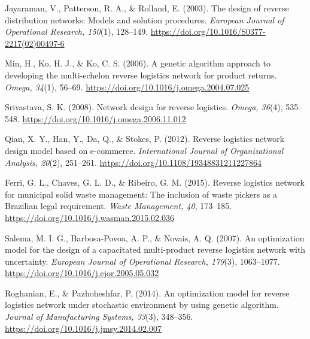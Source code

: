 \newpage %
\begin{thebibliography}{99} %

Jayaraman, V., Patterson, R. A., \& Rolland, E. (2003). The design of reverse distribution networks: Models and solution procedures. \textit{European Journal of Operational Research, 150}(1), 128--149. \href{https://doi.org/10.1016/S0377-2217(02)00497-6}{https://doi.org/10.1016/S0377-2217(02)00497-6}

Min, H., Ko, H. J., \& Ko, C. S. (2006). A genetic algorithm approach to developing the multi-echelon reverse logistics network for product returns. \textit{Omega, 34}(1), 56--69. \href{https://doi.org/10.1016/j.omega.2004.07.025}{https://doi.org/10.1016/j.omega.2004.07.025}

Srivastava, S. K. (2008). Network design for reverse logistics. \textit{Omega, 36}(4), 535--548. \href{https://doi.org/10.1016/j.omega.2006.11.012}{https://doi.org/10.1016/j.omega.2006.11.012}

Qian, X. Y., Han, Y., Da, Q., \& Stokes, P. (2012). Reverse logistics network design model based on e-commerce. \textit{International Journal of Organizational Analysis, 20}(2), 251--261. \href{https://doi.org/10.1108/19348831211227864}{https://doi.org/10.1108/19348831211227864}

Ferri, G. L., Chaves, G. L. D., \& Ribeiro, G. M. (2015). Reverse logistics network for municipal solid waste management: The inclusion of waste pickers as a Brazilian legal requirement. \textit{Waste Management, 40}, 173--185. \href{https://doi.org/10.1016/j.wasman.2015.02.036}{https://doi.org/10.1016/j.wasman.2015.02.036}

Salema, M. I. G., Barbosa-Povoa, A. P., \& Novais, A. Q. (2007). An optimization model for the design of a capacitated multi-product reverse logistics network with uncertainty. \textit{European Journal of Operational Research, 179}(3), 1063--1077. \href{https://doi.org/10.1016/j.ejor.2005.05.032}{https://doi.org/10.1016/j.ejor.2005.05.032}

Roghanian, E., \& Pazhoheshfar, P. (2014). An optimization model for reverse logistics network under stochastic environment by using genetic algorithm. \textit{Journal of Manufacturing Systems, 33}(3), 348--356. \href{https://doi.org/10.1016/j.jmsy.2014.02.007}{https://doi.org/10.1016/j.jmsy.2014.02.007}


\end{thebibliography}
